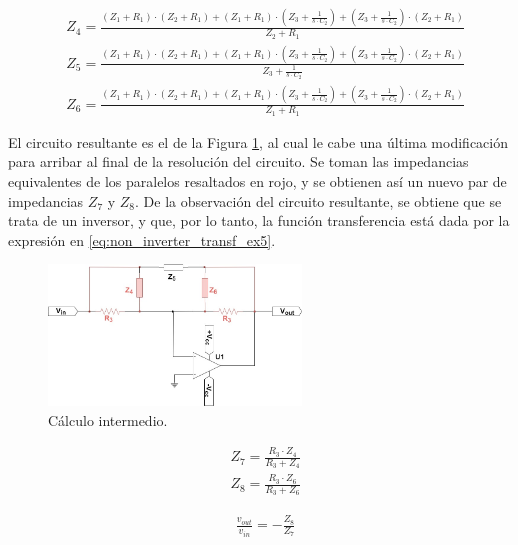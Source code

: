 \begin{align}
    &Z_4 = \frac{\left(Z_1 + R_1\right) \cdot \left(Z_2 + R_1\right) + \left(Z_1 + R_1\right) \cdot \left(Z_3 + \frac{1}{s \cdot C_2}\right) + \left(Z_3 + \frac{1}{s \cdot C_2}\right) \cdot \left(Z_2 + R_1\right)}{Z_2 + R_1}  \label{eq:ej5_z4} \\
    &Z_5 = \frac{\left(Z_1 + R_1\right) \cdot \left(Z_2 + R_1\right) + \left(Z_1 + R_1\right) \cdot \left(Z_3 + \frac{1}{s \cdot C_2}\right) + \left(Z_3 + \frac{1}{s \cdot C_2}\right) \cdot \left(Z_2 + R_1\right)}{Z_3 + \frac{1}{s \cdot C_2}}  \label{eq:ej5_z5} \\
    &Z_6 = \frac{\left(Z_1 + R_1\right) \cdot \left(Z_2 + R_1\right) + \left(Z_1 + R_1\right) \cdot \left(Z_3 + \frac{1}{s \cdot C_2}\right) + \left(Z_3 + \frac{1}{s \cdot C_2}\right) \cdot \left(Z_2 + R_1\right)}{Z_1 + R_1}  \label{eq:ej5_z6}
\end{align}

El circuito resultante es el de la Figura \ref{fig:Z78}, al cual le cabe una última modificación para arribar al final de la resolución del circuito.
Se toman las impedancias equivalentes de los paralelos resaltados en rojo, y se obtienen así un nuevo par de impedancias $Z_7$ y $Z_8$.
De la observación del circuito resultante, se obtiene que se trata de un inversor, y que, por lo tanto, la función transferencia está dada por la expresión en \ref{eq:non_inverter_transf_ex5}.
\begin{figure}[H]
    \centering
    \includegraphics[width=0.6\textwidth]{../EJ5/latex_resources/Z7_and_8}
    \caption{Cálculo intermedio.}
    \label{fig:Z78}
\end{figure}

\begin{align}
    &Z_7 = \frac{R_3 \cdot Z_4}{R_3 + Z_4} \label{eq:ej5_z7} \\
    &Z_8 = \frac{R_3 \cdot Z_6}{R_3 + Z_6} \label{eq:ej5_z8}
\end{align}

\begin{align}
    &\frac{v_{out}}{v_{in}} = - \frac{Z_8}{Z_7} \label{eq:non_inverter_transf_ex5}
\end{align}

